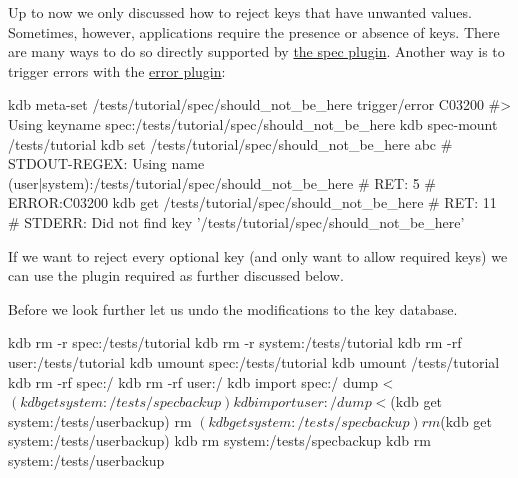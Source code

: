 Up to now we only discussed how to reject keys that have unwanted values. Sometimes, however, applications require the presence or absence of keys. There are many ways to do so directly supported by \hyperlink{autotoc_md605_src_plugins_spec_README_md}{the spec plugin}. Another way is to trigger errors with the \hyperlink{autotoc_md196_src_plugins_error_README_md}{error plugin}\+:


\begin{DoxyCode}
kdb meta-set /tests/tutorial/spec/should\_not\_be\_here trigger/error C03200
#> Using keyname spec:/tests/tutorial/spec/should\_not\_be\_here
kdb spec-mount /tests/tutorial
kdb set /tests/tutorial/spec/should\_not\_be\_here abc
# STDOUT-REGEX: Using name (user|system):/tests/tutorial/spec/should\_not\_be\_here
# RET:    5
# ERROR:C03200
kdb get /tests/tutorial/spec/should\_not\_be\_here
# RET: 11
# STDERR: Did not find key '/tests/tutorial/spec/should\_not\_be\_here'
\end{DoxyCode}


If we want to reject every optional key (and only want to allow required keys) we can use the plugin {\ttfamily required} as further discussed below.

Before we look further let us undo the modifications to the key database.


\begin{DoxyCode}
kdb rm -r spec:/tests/tutorial
kdb rm -r system:/tests/tutorial
kdb rm -rf user:/tests/tutorial
kdb umount spec:/tests/tutorial
kdb umount /tests/tutorial
kdb rm -rf spec:/
kdb rm -rf user:/
kdb import spec:/ dump < $(kdb get system:/tests/specbackup)
kdb import user:/ dump < $(kdb get system:/tests/userbackup)
rm $(kdb get system:/tests/specbackup)
rm $(kdb get system:/tests/userbackup)
kdb rm system:/tests/specbackup
kdb rm system:/tests/userbackup
\end{DoxyCode}
 